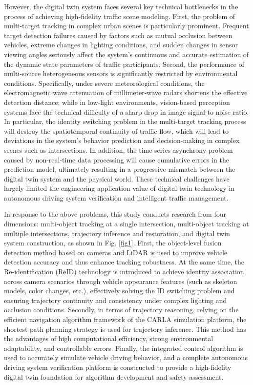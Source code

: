\documentclass[journal,twoside,web]{ieeecolor}
\begin{document}
However, the digital twin system faces several key technical bottlenecks in the process of achieving high-fidelity traffic scene modeling.
First, the problem of multi-target tracking in complex urban scenes is particularly prominent. Frequent target detection failures caused by factors such as mutual occlusion between vehicles, extreme changes in lighting conditions, and sudden changes in sensor viewing angles seriously affect the system's continuous and accurate estimation of the dynamic state parameters of traffic participants\cite{Alpher23c}.
Second, the performance of multi-source heterogeneous sensors is significantly restricted by environmental conditions. Specifically, under severe meteorological conditions, the electromagnetic wave attenuation of millimeter-wave radars shortens the effective detection distance; while in low-light environments, vision-based perception systems face the technical difficulty of a sharp drop in image signal-to-noise ratio.
In particular, the identity switching problem in the multi-target tracking process will destroy the spatiotemporal continuity of traffic flow, which will lead to deviations in the system's behavior prediction and decision-making in complex scenes such as intersections.
In addition, the time series asynchrony problem caused by non-real-time data processing will cause cumulative errors in the prediction model, ultimately resulting in a progressive mismatch between the digital twin system and the physical world.
These technical challenges have largely limited the engineering application value of digital twin technology in autonomous driving system verification and intelligent traffic management.

In response to the above problems, this study conducts research from four dimensions: multi-object tracking at a single intersection, multi-object tracking at multiple intersections, trajectory inference and restoration, and digital twin system construction, as shown in Fig. \ref{fig1}. 
First, the object-level fusion detection method based on cameras and LiDAR is used to improve vehicle detection accuracy and thus enhance tracking robustness. 
At the same time, the Re-identification (ReID) technology is introduced to achieve identity association across camera scenarios through vehicle appearance features (such as skeleton models, color changes, etc.), effectively solving the ID switching problem and ensuring trajectory continuity and consistency under complex lighting and occlusion conditions\cite{Alpher23}. 
Secondly, in terms of trajectory reasoning, relying on the efficient navigation algorithm framework of the CARLA simulation platform, the shortest path planning strategy is used for trajectory inference. 
This method has the advantages of high computational efficiency, strong environmental adaptability, and controllable errors. 
Finally, the integrated control algorithm is used to accurately simulate vehicle driving behavior, and a complete autonomous driving system verification platform is constructed to provide a high-fidelity digital twin foundation for algorithm development and safety assessment\cite{Alpher24c}.
\end{document}
